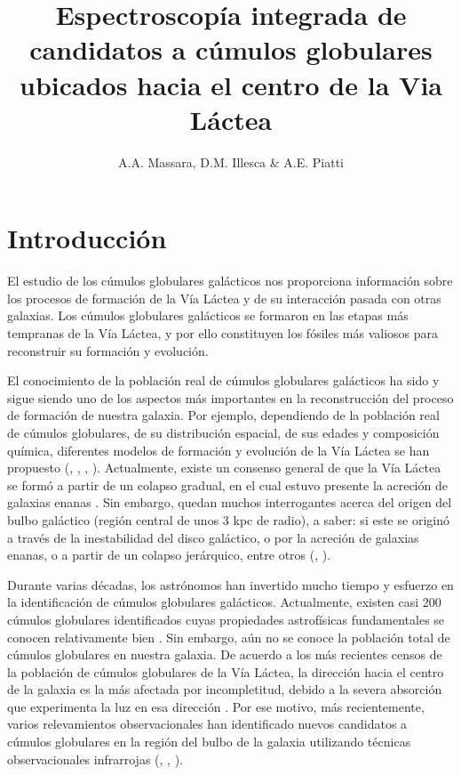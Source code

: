\documentclass[baaa]{baaa}
\title{Espectroscopía integrada de candidatos a cúmulos globulares ubicados hacia el centro de la Via Láctea
}
\author{A.A. Massara\inst{1}, D.M. Illesca\inst{1,2} \& A.E. Piatti\inst{1,2}
}
\institute{
Facultad de Ciencias Exactas y Naturales, UNCUYO, Argentina
\and
Instituto Interdisciplinario de Ciencias Básicas, CONICET--UNCUYO, Argentina
}
\begin{document}
\maketitle
\section{Introducción}\label{S_intro}

 El estudio de los cúmulos globulares galácticos nos proporciona información sobre los procesos de formación de la Vía Láctea y de su interacción pasada con otras galaxias. Los cúmulos globulares galácticos se formaron en las etapas más tempranas de la Vía Láctea, y por ello constituyen los fósiles más valiosos para reconstruir su formación y evolución.

El conocimiento de la población real de cúmulos globulares galácticos ha sido y sigue siendo uno de los aspectos más importantes en la reconstrucción del proceso de formación de nuestra galaxia. Por ejemplo, dependiendo de la población real de cúmulos globulares, de su distribución espacial, de sus edades y composición química, diferentes modelos de formación y evolución de la Vía Láctea se han propuesto (\citealt{prantzos-1998}, \citealt{gilmore-1999}, \citealt{jang-2015}, \citealt{keller-2020}). Actualmente, existe un consenso general de que la Vía Láctea se formó a partir de un colapso gradual, en el cual estuvo presente la acreción de galaxias enanas \citep{kruijssen-2019}. Sin embargo, quedan muchos interrogantes acerca del origen del bulbo galáctico (región central de unos 3 kpc de radio), a saber: si este se originó a través de la inestabilidad del disco galáctico, o por la acreción de galaxias enanas, o a partir de un colapso jerárquico, entre otros (\cite{debattista-2019}, \cite{lian-2021}).

Durante varias décadas, los astrónomos han invertido mucho tiempo y esfuerzo en la identificación de cúmulos globulares galácticos. Actualmente, existen casi 200 cúmulos globulares identificados cuyas propiedades astrofísicas fundamentales se conocen relativamente bien \citep{baumgardt-2019}. Sin embargo, aún no se conoce la población total de cúmulos globulares en nuestra galaxia. De acuerdo a los más recientes censos de la población de cúmulos globulares de la Vía Láctea, la dirección hacia el centro de la galaxia es la más afectada por incompletitud, debido a la severa absorción que experimenta la luz en esa dirección \citep{harris-1996}. Por ese motivo, más recientemente, varios relevamientos observacionales han identificado nuevos candidatos a cúmulos globulares en la región del bulbo de la galaxia utilizando técnicas observacionales infrarrojas (\cite{froebrich-2008}, \cite{minniti-2017}, \cite{camargo-2018}).
\end{document}
